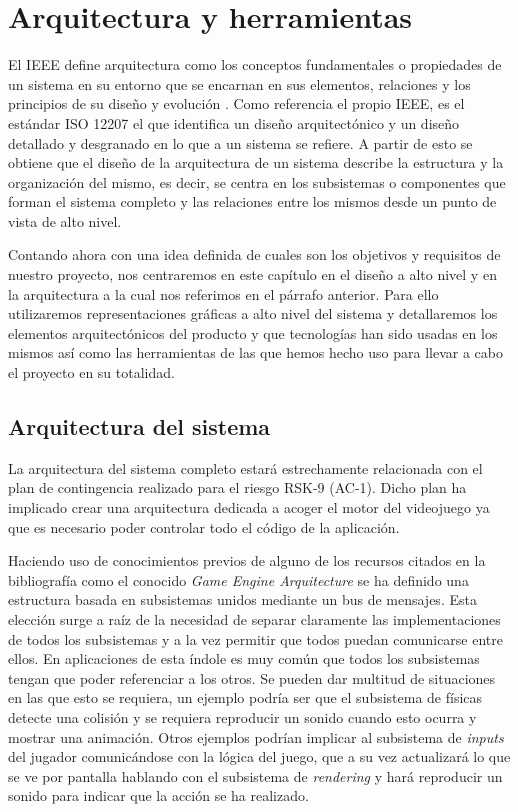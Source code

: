 \chapter{Arquitectura y herramientas}

El IEEE define arquitectura como los conceptos fundamentales o propiedades de un sistema en su entorno que se encarnan en sus elementos, relaciones y los principios de su diseño y evolución \cite{definiendo_arquitectura}.
Como referencia el propio IEEE, es el estándar ISO 12207 el que identifica un diseño arquitectónico y un diseño detallado y desgranado en lo que a un sistema se refiere. A partir de esto se obtiene que el diseño de la arquitectura de un sistema describe la estructura y la organización del mismo, es decir, se centra en los subsistemas o componentes que forman el sistema completo y las relaciones entre los mismos desde un punto de vista de alto nivel.

\bigskip

Contando ahora con una idea definida de cuales son los objetivos y requisitos de nuestro proyecto, nos centraremos en este capítulo en el diseño a alto nivel y en la arquitectura a la cual nos referimos en el párrafo anterior. Para ello utilizaremos representaciones gráficas a alto nivel del sistema y detallaremos los elementos arquitectónicos del producto y que tecnologías han sido usadas en los mismos así como las herramientas de las que hemos hecho uso para llevar a cabo el proyecto en su totalidad.

\section{Arquitectura del sistema}

La arquitectura del sistema completo estará estrechamente relacionada con el plan de contingencia realizado para el riesgo RSK-9 (AC-1). Dicho plan ha implicado crear una arquitectura dedicada a acoger el motor del videojuego ya que es necesario poder controlar todo el código de la aplicación.

\bigskip

Haciendo uso de conocimientos previos de alguno de los recursos citados en la bibliografía como el conocido \textit{Game Engine Arquitecture}\cite{game_engine} se ha definido una estructura basada en subsistemas unidos mediante un bus de mensajes. Esta elección surge a raíz de la necesidad de separar claramente las implementaciones de todos los subsistemas y a la vez permitir que todos puedan comunicarse entre ellos. En aplicaciones de esta índole es muy común que todos los subsistemas tengan que poder referenciar a los otros. Se pueden dar multitud de situaciones en las que esto se requiera, un ejemplo podría ser que el subsistema de físicas detecte una colisión y se requiera reproducir un sonido cuando esto ocurra y mostrar una animación. Otros ejemplos podrían implicar al subsistema de \textit{inputs} del jugador comunicándose con la lógica del juego, que a su vez actualizará lo que se ve por pantalla hablando con el subsistema de \textit{rendering} y hará reproducir un sonido para indicar que la acción se ha realizado.

